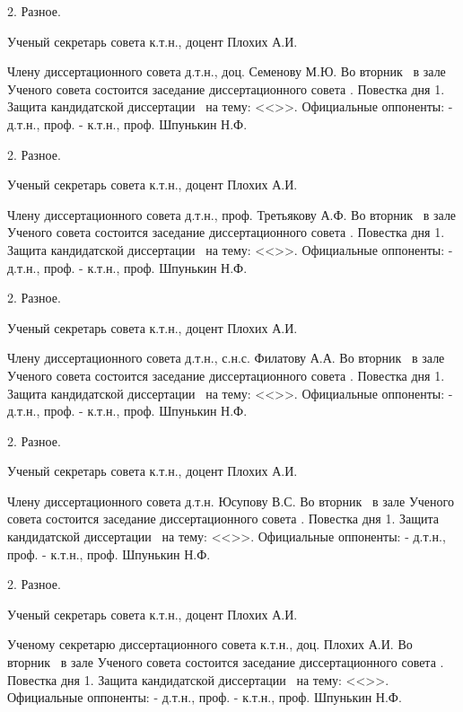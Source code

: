 2.	Разное.

Ученый секретарь совета
к.т.н., доцент		Плохих А.И. 



Члену диссертационного совета
д.т.н., доц. Семенову М.Ю.
Во вторник \ в зале Ученого совета состоится заседание диссертационного совета .
Повестка дня
1.	Защита кандидатской диссертации \thesisAuthorLastNameKemFull\ на тему: <<\thesisTitle>>.
Официальные оппоненты:	- д.т.н., проф.	\opponentOneFioShort
- к.т.н., проф.	Шпунькин Н.Ф.

2.	Разное.

Ученый секретарь совета
к.т.н., доцент		Плохих А.И. 



Члену диссертационного совета
д.т.н., проф. Третьякову А.Ф.
Во вторник \ в зале Ученого совета состоится заседание диссертационного совета .
Повестка дня
1.	Защита кандидатской диссертации \thesisAuthorLastNameKemFull\ на тему: <<\thesisTitle>>.
Официальные оппоненты:	- д.т.н., проф.	\opponentOneFioShort
- к.т.н., проф.	Шпунькин Н.Ф.

2.	Разное.

Ученый секретарь совета
к.т.н., доцент		Плохих А.И. 



Члену диссертационного совета
д.т.н., с.н.с. Филатову А.А.
Во вторник \ в зале Ученого совета состоится заседание диссертационного совета .
Повестка дня
1.	Защита кандидатской диссертации \thesisAuthorLastNameKemFull\ на тему: <<\thesisTitle>>.
Официальные оппоненты:	- д.т.н., проф.	\opponentOneFioShort
- к.т.н., проф.	Шпунькин Н.Ф.

2.	Разное.

Ученый секретарь совета
к.т.н., доцент		Плохих А.И. 



Члену диссертационного совета
д.т.н. Юсупову В.С.
Во вторник \ в зале Ученого совета состоится заседание диссертационного совета .
Повестка дня
1.	Защита кандидатской диссертации \thesisAuthorLastNameKemFull\ на тему: <<\thesisTitle>>.
Официальные оппоненты:	- д.т.н., проф.	\opponentOneFioShort
- к.т.н., проф.	Шпунькин Н.Ф.

2.	Разное.

Ученый секретарь совета
к.т.н., доцент		Плохих А.И. 



Ученому секретарю диссертационного совета
к.т.н., доц. Плохих А.И.
Во вторник \ в зале Ученого совета состоится заседание диссертационного совета  .
Повестка дня
1.	Защита кандидатской диссертации \thesisAuthorLastNameKemFull\ на тему: <<\thesisTitle>>.
Официальные оппоненты:	- д.т.н., проф.	\opponentOneFioShort
- к.т.н., проф.	Шпунькин Н.Ф.

